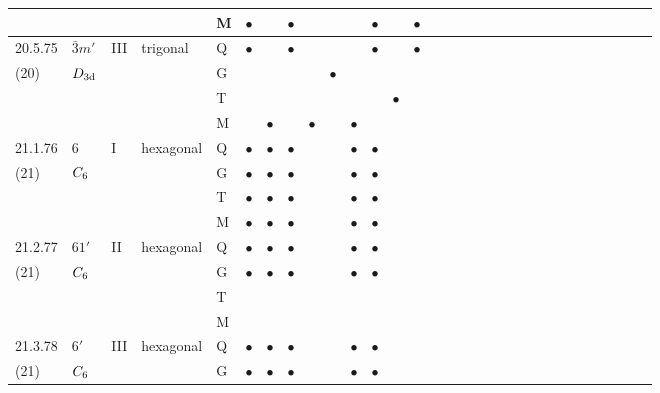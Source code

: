 \documentclass[fleqn,9pt,landscape]{jsarticle}
\begin{document}
\begin{longtable}{lllll|l|l|l|l|l|l|l|l|l|ll|ll|ll|ll|ll|ll|ll|ll}
 &  &  &  & M & $\bullet$ &  & $\bullet$ &  &  &  & $\bullet$ &  & $\bullet$ &  &  &  &  &  &  &  &  &  &  &  &  &  &  &  &  \\ \hline
20.5.75 & \texttt{$\bar{3}m'$} & III & trigonal & Q & $\bullet$ &  & $\bullet$ &  &  &  & $\bullet$ &  & $\bullet$ &  &  &  &  &  &  &  &  &  &  &  &  &  &  &  &  \\
(20) & $D_{\rm 3d}$ &  &  & G &  &  &  &  & $\bullet$ &  &  &  &  &  &  &  &  &  &  &  &  &  &  &  &  &  &  &  &  \\
 &  &  &  & T &  &  &  &  &  &  &  & $\bullet$ &  &  &  &  &  &  &  &  &  &  &  &  &  &  &  &  &  \\
 &  &  &  & M &  & $\bullet$ &  & $\bullet$ &  & $\bullet$ &  &  &  &  &  &  &  &  &  &  &  &  &  &  &  &  &  &  &  \\ \hline
21.1.76 & \texttt{$6$} & I & hexagonal & Q & $\bullet$ & $\bullet$ & $\bullet$ &  &  & $\bullet$ & $\bullet$ &  &  &  &  &  &  &  &  &  &  &  &  &  &  &  &  &  &  \\
(21) & $C_{\rm 6}$ &  &  & G & $\bullet$ & $\bullet$ & $\bullet$ &  &  & $\bullet$ & $\bullet$ &  &  &  &  &  &  &  &  &  &  &  &  &  &  &  &  &  &  \\
 &  &  &  & T & $\bullet$ & $\bullet$ & $\bullet$ &  &  & $\bullet$ & $\bullet$ &  &  &  &  &  &  &  &  &  &  &  &  &  &  &  &  &  &  \\
 &  &  &  & M & $\bullet$ & $\bullet$ & $\bullet$ &  &  & $\bullet$ & $\bullet$ &  &  &  &  &  &  &  &  &  &  &  &  &  &  &  &  &  &  \\ \hline
21.2.77 & \texttt{$61'$} & II & hexagonal & Q & $\bullet$ & $\bullet$ & $\bullet$ &  &  & $\bullet$ & $\bullet$ &  &  &  &  &  &  &  &  &  &  &  &  &  &  &  &  &  &  \\
(21) & $C_{\rm 6}$ &  &  & G & $\bullet$ & $\bullet$ & $\bullet$ &  &  & $\bullet$ & $\bullet$ &  &  &  &  &  &  &  &  &  &  &  &  &  &  &  &  &  &  \\
 &  &  &  & T &  &  &  &  &  &  &  &  &  &  &  &  &  &  &  &  &  &  &  &  &  &  &  &  &  \\
 &  &  &  & M &  &  &  &  &  &  &  &  &  &  &  &  &  &  &  &  &  &  &  &  &  &  &  &  &  \\ \hline
21.3.78 & \texttt{$6'$} & III & hexagonal & Q & $\bullet$ & $\bullet$ & $\bullet$ &  &  & $\bullet$ & $\bullet$ &  &  &  &  &  &  &  &  &  &  &  &  &  &  &  &  &  &  \\
(21) & $C_{\rm 6}$ &  &  & G & $\bullet$ & $\bullet$ & $\bullet$ &  &  & $\bullet$ & $\bullet$ &  &  &  &  &  &  &  &  &  &  &  &  &  &  &  &  &  &  \\

\end{longtable}
\end{document}
